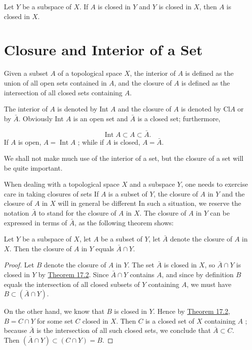 \begin{theorem}
\label{thm:\thetheorem}
 Let \(Y\) be a subspace of \(X\). If \(A\) is closed in \(Y\) and \(Y\) is closed in \(X\), then \(A\) is closed in \(X\).

\end{theorem}
\section*{Closure and Interior of a Set}

Given a subset \(A\) of a topological space \(X\), the interior of \(A\) is defined as the union of all open sets contained in \(A\), and the closure of \(A\) is defined as the intersection of all closed sets containing \(A\).

The interior of \(A\) is denoted by Int \(A\) and the closure of \(A\) is denoted by \(\mathrm{Cl} A\) or by \(\bar{A}\). Obviously Int \(A\) is an open set and \(\bar{A}\) is a closed set; furthermore,

\[
\operatorname{Int}A \subset A \subset \bar{A}.
\]
If \(A\) is open, \(A = \operatorname{Int}A\) ; while if \(A\) is closed, \(A = \bar{A}\).

We shall not make much use of the interior of a set, but the closure of a set will be quite important.

When dealing with a topological space \(X\) and a subspace \(Y\), one needs to exercise care in taking closures of sets If \(A\) is a subset of \(Y\), the closure of \(A\) in \(Y\) and the closure of \(A\) in \(X\) will in general be different In such a situation, we reserve the notation \(\bar{A}\) to stand for the closure of \(A\) in \(X\). The closure of \(A\) in \(Y\) can be expressed in terms of \(\bar{A}\), as the following theorem shows:

\begin{theorem}
\label{thm:\thetheorem}
 Let \(Y\) be a subspace of \(X\), let \(A\) be a subset of \(Y\), let \(\bar{A}\) denote the closure of \(A\) in \(X\). Then the closure of \(A\) in \(Y\) equals \(\bar{A} \cap Y\).

\end{theorem}
\begin{proof}
 Let \(B\) denote the closure of \(A\) in \(Y\). The set \(\bar{A}\) is closed in \(X\), so \(\bar{A} \cap Y\) is closed in \(Y\) by \hyperref[thm:17.2]{Theorem 17.2}. Since \(\bar{A} \cap Y\) contains \(A\), and since by definition \(B\) equals the intersection of all closed subsets of \(Y\) containing \(A\), we must have \(B \subset ( {\bar{A} \cap Y})\).

 On the other hand, we know that \(B\) is closed in \(Y\). Hence by \hyperref[thm:17.2]{Theorem 17.2}, \(B = C \cap Y\) for some set \(C\) closed in \(X\). Then \(C\) is a closed set of \(X\) containing \(A\) ; because \(\bar{A}\) is the intersection of all such closed sets, we conclude that \(\bar{A} \subset C\). Then \(( {\bar{A} \cap Y}) \subset ( {C \cap Y}) = B.\)
\end{proof}

